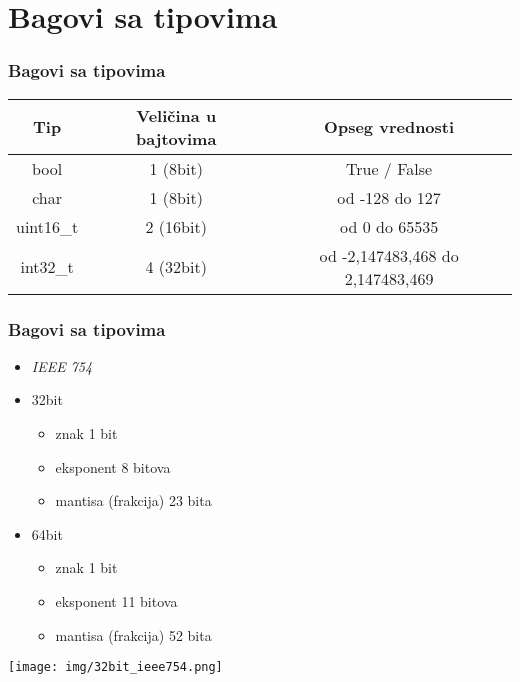\documentclass{beamer}
\begin{document}
\section{Bagovi sa tipovima}

\begin{frame}
    \frametitle{Bagovi sa tipovima}
    \begin{center}
        \begin{tabular}{ |c|c|c| }%
            \hline
            Tip & Veličina u bajtovima & Opseg vrednosti \\
            \hline
            bool & 1 (8bit) & True / False \\
            \hline
            char & 1 (8bit) & od -128 do 127 \\
            \hline
            uint16\_t & 2 (16bit) & od 0 do 65535 \\
            \hline
            int32\_t & 4 (32bit) & od -2,147483,468 do 2,147483,469 \\            
            \hline
        \end{tabular}
    \end{center}
\end{frame}

\begin{frame}
    \frametitle{Bagovi sa tipovima}
    
    \begin{itemize}
        \item \textit {IEEE 754} \newline
        \item 32bit
         \begin{itemize}
            \item znak 1 bit
            \item eksponent 8 bitova
            \item mantisa (frakcija) 23 bita
        \end{itemize}
        \item 64bit
         \begin{itemize}
            \item znak 1 bit
            \item eksponent 11 bitova
            \item mantisa (frakcija) 52 bita
        \end{itemize}
    \end{itemize}

    \begin{center}
        \texttt{[image: img/32bit\_ieee754.png]}
    \end{center}
\end{frame}
\end{document}
